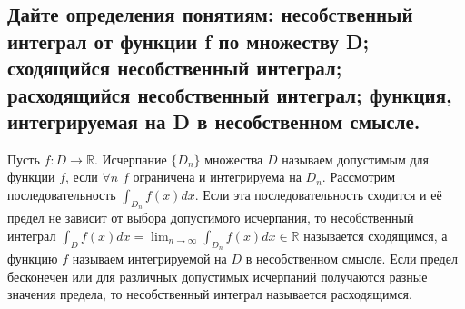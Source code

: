 
\subsection{Дайте определения понятиям: несобственный интеграл от функции f по множеству D; сходящийся несобственный интеграл; расходящийся несобственный интеграл; функция, интегрируемая на D в несобственном смысле.}
Пусть $f: D \rightarrow \mathbb{R}$. Исчерпание $\{D_n\}$ множества $D$ называем допустимым для функции $f$, если $\forall n$ $f$ ограничена и интегрируема на $D_n$. Рассмотрим последовательность $\int_{D_n} f(x) dx$. Если эта последовательность сходится и её предел не зависит от выбора допустимого исчерпания, то несобственный интеграл $\int_{D} f(x) dx = \lim_{n \to \infty} \int_{D_n} f(x) dx \in \mathbb{R}$ называется сходящимся, а функцию $f$ называем интегрируемой на $D$ в несобственном смысле. Если предел бесконечен или для различных допустимых исчерпаний получаются разные значения предела, то несобственный интеграл называется расходящимся. 
